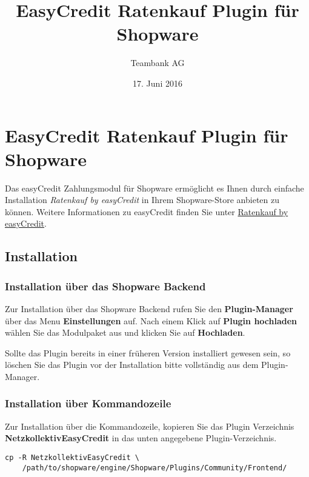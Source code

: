 \usepackage[ngerman]{babel}
\afterpage{\clearpage}
\renewcommand{\contentsname}{Inhalt}
\renewcommand{\tableofcontents}{\tableofcontents\pagebreak}

\title{EasyCredit Ratenkauf Plugin für Shopware}
\author{Teambank AG}
\date{17. Juni 2016}

\section{EasyCredit Ratenkauf Plugin für
Shopware}\label{easycredit-ratenkauf-plugin-fuxfcr-shopware}

Das easyCredit Zahlungsmodul für Shopware ermöglicht es Ihnen durch
einfache Installation \emph{Ratenkauf by easyCredit} in Ihrem
Shopware-Store anbieten zu können. Weitere Informationen zu easyCredit
finden Sie unter
\href{https://www.easycredit-ratenkauf.de/haendler.htm}{Ratenkauf by easyCredit}.

\subsection{Installation}\label{installation}

\subsubsection{Installation über das Shopware
Backend}\label{installation-uxfcber-das-shopware-backend}

Zur Installation über das Shopware Backend rufen Sie den
\textbf{Plugin-Manager} über das Menu \textbf{Einstellungen} auf. Nach
einem Klick auf \textbf{Plugin hochladen} wählen Sie das Modulpaket aus
und klicken Sie auf \textbf{Hochladen}.

Sollte das Plugin bereits in einer früheren Version installiert gewesen
sein, so löschen Sie das Plugin vor der Installation bitte vollständig
aus dem Plugin-Manager.

\subsubsection{Installation über
Kommandozeile}\label{installation-uxfcber-kommandozeile}

Zur Installation über die Kommandozeile, kopieren Sie das Plugin
Verzeichnis \textbf{NetzkollektivEasyCredit} in das unten angegebene
Plugin-Verzeichnis.

\begin{verbatim}
cp -R NetzkollektivEasyCredit \
    /path/to/shopware/engine/Shopware/Plugins/Community/Frontend/
\end{verbatim}

